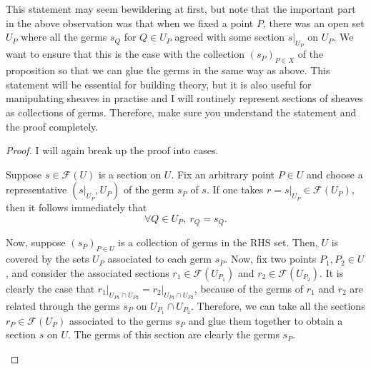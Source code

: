 This statement may seem bewildering at first, but note that the important
part in the above observation was that when we fixed a point $P$, there was
an open set $U_{P}$ where all the germs $s_{Q}$ for $Q\in U_{P}$ agreed
with some section $s\vert_{U_{P}}$ on $U_{P}$. We want to ensure that this is
the case with the collection $(s_{P})_{P\in X}$ of the proposition so that we
can glue the germs in the same way as above. This statement will be essential
for building theory, but it is also useful for manipulating sheaves in
practise and I will routinely represent sections of sheaves as collections
of germs. Therefore, make sure you understand the statement and the proof
completely.
\begin{proof}
  I will again break up the proof into cases.

  \begin{description}[style=nextline]
    \item[$\subseteq\big)$]
          Suppose $s\in\mathscr{F}(U)$ is a section on $U$. Fix an arbitrary
          point $P\in U$ and choose a representative $(s\vert_{U_{P}}, U_{P})$
          of the germ $s_{P}$ of $s$. If one takes $r=s\vert_{U_{P}}\in
          \mathscr{F}(U_{P})$, then it follows immediately that
          \[\forall Q\in U_{P},\ r_{Q}=s_{Q}.\]
    \item[$\supseteq\big)$]
          Now, suppose $(s_{P})_{P\in U}$ is a collection of germs in the
          RHS set. Then, $U$ is covered by the sets $U_{P}$ associated to
          each germ $s_{P}$. Now, fix two points $P_{1},P_{2}\in U$,
          and consider the associated sections $r_{1}\in\mathscr{F}(U_{P_{1}})$
          and $r_{2}\in\mathscr{F}(U_{P_{2}})$. It is clearly the case that
          $r_{1}\vert_{U_{P1}\cap U_{P2}}=r_{2}\vert_{U_{P1}\cap U_{P2}}$, because
          of the germs of $r_{1}$ and $r_{2}$ are related through the germs
          $s_{P}$ on $U_{P_{1}}\cap U_{P_{2}}$. Therefore, we can take all
          the sections $r_{P}\in\mathscr{F}(U_{P})$ associated to the germs
          $s_{P}$ and glue them together to obtain a section $s$ on $U$.
          The germs of this section are clearly the germs $s_{P}$.
  \end{description}
\end{proof}

